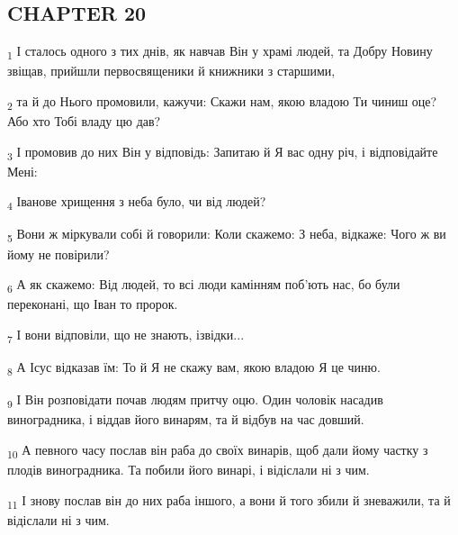 \subsection{CHAPTER 20}
\begin{tcolorbox}
\textsubscript{1} І сталось одного з тих днів, як навчав Він у храмі людей, та Добру Новину звіщав, прийшли первосвященики й книжники з старшими,
\end{tcolorbox}
\begin{tcolorbox}
\textsubscript{2} та й до Нього промовили, кажучи: Скажи нам, якою владою Ти чиниш оце? Або хто Тобі владу цю дав?
\end{tcolorbox}
\begin{tcolorbox}
\textsubscript{3} І промовив до них Він у відповідь: Запитаю й Я вас одну річ, і відповідайте Мені:
\end{tcolorbox}
\begin{tcolorbox}
\textsubscript{4} Іванове хрищення з неба було, чи від людей?
\end{tcolorbox}
\begin{tcolorbox}
\textsubscript{5} Вони ж міркували собі й говорили: Коли скажемо: З неба, відкаже: Чого ж ви йому не повірили?
\end{tcolorbox}
\begin{tcolorbox}
\textsubscript{6} А як скажемо: Від людей, то всі люди камінням поб'ють нас, бо були переконані, що Іван то пророк.
\end{tcolorbox}
\begin{tcolorbox}
\textsubscript{7} І вони відповіли, що не знають, ізвідки...
\end{tcolorbox}
\begin{tcolorbox}
\textsubscript{8} А Ісус відказав їм: То й Я не скажу вам, якою владою Я це чиню.
\end{tcolorbox}
\begin{tcolorbox}
\textsubscript{9} І Він розповідати почав людям притчу оцю. Один чоловік насадив виноградника, і віддав його винарям, та й відбув на час довший.
\end{tcolorbox}
\begin{tcolorbox}
\textsubscript{10} А певного часу послав він раба до своїх винарів, щоб дали йому частку з плодів виноградника. Та побили його винарі, і відіслали ні з чим.
\end{tcolorbox}
\begin{tcolorbox}
\textsubscript{11} І знову послав він до них раба іншого, а вони й того збили й зневажили, та й відіслали ні з чим.
\end{tcolorbox}
